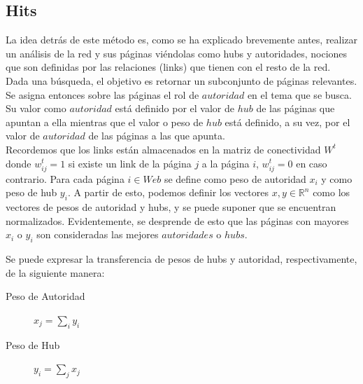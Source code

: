 \documentclass[a4paper]{article}
\begin{document}





\subsection{Hits}

La idea detr\'as de este m\'etodo es, como se ha explicado brevemente antes, realizar un an\'{a}lisis de la red y sus p\'aginas vi\'endolas como hubs y autoridades, nociones que son definidas por las relaciones (links) que tienen con el resto de la red.\\

Dada una b\'{u}squeda, el objetivo es retornar un subconjunto de páginas relevantes.
Se asigna entonces sobre las p\'aginas el rol de $autoridad$ en el tema que se busca. Su valor como $autoridad$ est\'a definido por el valor de $hub$ de las p\'{a}ginas que apuntan a ella mientras que el valor o peso de $hub$ est\'a definido, a su vez, por el valor de $autoridad$ de las p\'{a}ginas a las que apunta.\\

Recordemos que los links están almacenados en la matriz de conectividad $W^t$ donde $w^t_{ij} = 1$ si existe un link de la p\'agina $j$ a la p\'agina $i$,  $w^t_{ij} = 0$ en caso contrario. Para cada p\'agina $i \in Web$ se define como peso de autoridad $x_i$ y como peso de hub $y_i$.
A partir de esto, podemos definir los vectores $x,y \in \mathbb{R}^n$ como los vectores de pesos de autoridad y hubs, y se puede suponer que se encuentran normalizados.
Evidentemente, se desprende de esto que las p\'{a}ginas con mayores $x_i$ o $y_i$ son consideradas las mejores $autoridades$ o $hubs$.

Se puede expresar la transferencia de pesos de hubs y autoridad, respectivamente, de la siguiente manera:

\begin{description}

\item[Peso de Autoridad] $x_j = \sum_{i} y_i$

\item[Peso de Hub] $y_i = \sum_{j} x_j$

\end{description}
\end{document}
